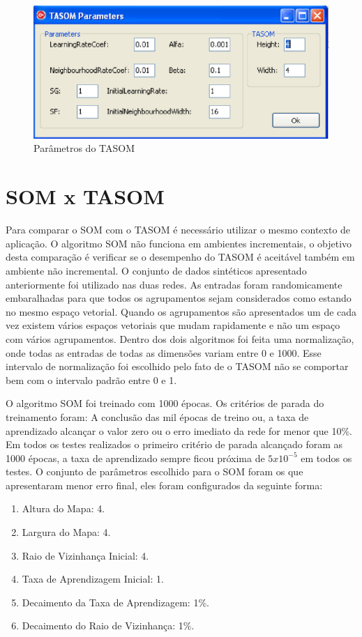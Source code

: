 \begin{figure}[!h]
\centering
\includegraphics[keepaspectratio=true,scale=0.5]
{figuras/tasomparams.eps}
\caption{Parâmetros do TASOM}
\label{data_titatic}
\end{figure}

\section{SOM x TASOM}
Para comparar o SOM com o TASOM é necessário utilizar o mesmo contexto de aplicação. O algoritmo SOM não funciona em ambientes incrementais, o objetivo desta comparação é verificar se o desempenho do TASOM é aceitável também em ambiente não incremental. O conjunto de dados sintéticos apresentado anteriormente foi utilizado nas duas redes. As entradas foram randomicamente embaralhadas para que todos os agrupamentos sejam considerados como estando no mesmo espaço vetorial. Quando os agrupamentos são apresentados um de cada vez existem vários espaços vetoriais que mudam rapidamente e não um espaço com vários agrupamentos. Dentro dos dois algoritmos foi feita uma normalização, onde todas as entradas de todas as dimensões variam entre 0 e 1000. Esse intervalo de normalização foi escolhido pelo fato de o TASOM não se comportar bem com o intervalo padrão entre 0 e 1.

O algoritmo SOM foi treinado com 1000 épocas. Os critérios de parada do treinamento foram: A conclusão das mil épocas de treino ou, a taxa de aprendizado alcançar o valor zero ou o erro imediato da rede for menor que 10\%. Em todos os testes realizados o primeiro critério de parada alcançado foram as 1000 épocas, a taxa de aprendizado sempre ficou próxima de $5 x 10^{-5}$ em todos os testes. O conjunto de parâmetros escolhido para o SOM foram os que apresentaram menor erro final, eles foram configurados da seguinte forma: 

\begin{enumerate}
\item Altura do Mapa: 4.
\item Largura do Mapa: 4.
\item Raio de Vizinhança Inicial: 4.
\item Taxa de Aprendizagem Inicial: 1.
\item Decaimento da Taxa de Aprendizagem: 1\%.
\item Decaimento do Raio de Vizinhança: 1\%.
\end{enumerate}

